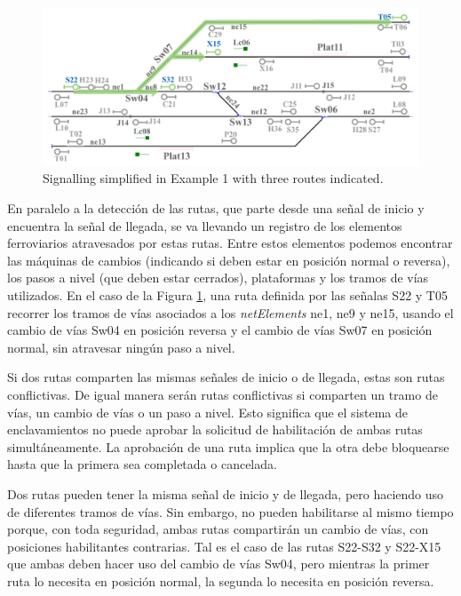     \begin{figure}[H]
    	\centering
    	\includegraphics[width=1\textwidth]{Figuras/Figure11.pdf}
    	\centering\caption{Signalling simplified in Example 1 with three routes indicated.}
    	\label{fig:Routes}
    \end{figure}
        
    En paralelo a la detección de las rutas, que parte desde una señal de inicio y encuentra la señal de llegada, se va llevando un registro de los elementos ferroviarios atravesados por estas rutas. Entre estos elementos podemos encontrar las máquinas de cambios (indicando si deben estar en posición normal o reversa), los pasos a nivel (que deben estar cerrados), plataformas y los tramos de vías utilizados. En el caso de la Figura \ref{fig:Routes}, una ruta definida por las señalas S22 y T05 recorrer los tramos de vías asociados a los \textit{netElements} ne1, ne9 y ne15, usando el cambio de vías Sw04 en posición reversa y el cambio de vías Sw07 en posición normal, sin atravesar ningún paso a nivel.
    
    Si dos rutas comparten las mismas señales de inicio o de llegada, estas son rutas conflictivas. De igual manera serán rutas conflictivas si comparten un tramo de vías, un cambio de vías o un paso a nivel. Esto significa que el sistema de enclavamientos no puede aprobar la solicitud de habilitación de ambas rutas simultáneamente. La aprobación de una ruta implica que la otra debe bloquearse hasta que la primera sea completada o cancelada. 
    
    Dos rutas pueden tener la misma señal de inicio y de llegada, pero haciendo uso de diferentes tramos de vías. Sin embargo, no pueden habilitarse al mismo tiempo porque, con toda seguridad, ambas rutas compartirán un cambio de vías, con posiciones habilitantes contrarias. Tal es el caso de las rutas S22-S32 y S22-X15 que ambas deben hacer uso del cambio de vías Sw04, pero mientras la primer ruta lo necesita en posición normal, la segunda lo necesita en posición reversa.
    
